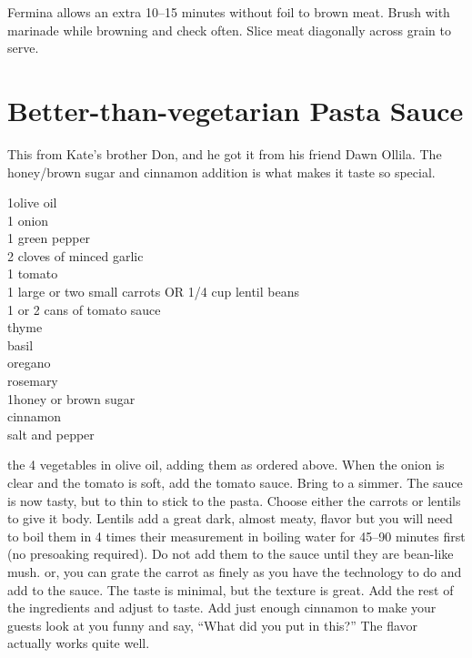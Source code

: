 Fermina allows an extra \numrange{10}{15} minutes without foil to brown meat.
Brush with marinade while browning and check often.  Slice meat diagonally
across grain to serve.

\section{Better-than-vegetarian Pasta Sauce
}

\begin{open}
  This from Kate's brother Don, and he got it from his friend Dawn Ollila. The honey/brown sugar and cinnamon addition is what makes it taste so special.
\end{open}
\begin{ingredients}
  \SI{1}{\tblspoon}olive oil \\
  1 onion \\
  1 green pepper \\
  2 cloves of minced garlic \\
  1 tomato\\
  1 large or two small carrots OR \SI{1/4}{\cup} cup lentil beans \\
  1 or 2 cans of tomato sauce \\
  thyme \\
  basil \\
  oregano \\
  rosemary \\
  \SI{1}{\tblspoon}honey or brown sugar \\
  cinnamon \\
  salt and pepper
\end{ingredients}
\Saute the 4 vegetables in olive oil, adding them as ordered above. When the
onion is clear and the tomato is soft, add the tomato sauce.  Bring to a
simmer. The sauce is now tasty, but to thin to stick to the pasta.  Choose
either the carrots or lentils to give it body. Lentils add a great dark,
almost meaty, flavor but you will need to boil them in 4 times their
measurement in boiling water for \numrange{45}{90} minutes first
(no presoaking required). Do not add them to the sauce until they are
bean-like mush. or, you can grate the carrot as finely as you have the
technology to do and add to the sauce. The taste is minimal, but the texture
is great. Add the rest of the ingredients and adjust to taste. Add just enough
cinnamon to make your guests look at you funny and say, ``What did you put in
this?'' The flavor actually works quite well.

